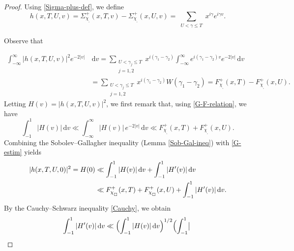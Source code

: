 \documentclass[pdflatex]{sn-jnl}%
\newcommand{\dx}{\mathrm{d}}
\theoremstyle{sltheorems}
\theoremstyle{plainrem}
\theoremstyle{definition}
\begin{document}
\begin{proof}
Using \eqref{Sigma-plus-def}, we define
%
\begin{equation}
\label{defgv}
h(x, T, U, v) = 
\Sigma^+_{\chi_{_\square}}(x,T,v) -
\Sigma^+_{\chi_{_\square}}(x,U,v) 
= \sum_{\substack{U <  \gamma \le  T
}} x^{i\gamma}e^{i\gamma v}.
\end{equation}

\noindent
Observe that

\begin{align}
\nonumber
   \int_{-\infty}^{\infty}
    \vert h(x, T, U, v) \vert ^2e^{-2 \vert v \vert }& \, \dx v 
   =
   \sum_{\substack{U <  \gamma_j \le  T\\ j = 1,2}} 
   x^{i(\gamma_1-\gamma_2)}
   \int_{-\infty}^{\infty}
   e^{i(\gamma_1-\gamma_2)v}e^{-2 \vert v \vert } \, \dx v 
  \\
   \label{G-F-relation}
   & =
    \sum_{\substack{U <  \gamma_j \le  T\\
   j = 1,2
   }} 
   x^{i(\gamma_1-\gamma_2)}
   W(\gamma_1 - \gamma_2)
   = F^+_{\chi_{_\square}}(x,T) - F^+_{\chi_{_\square}}(x,U).
\end{align}
%
Letting $H(v) =  \vert  h(x, T, U, v) \vert ^2$,
we first remark that, using \eqref{G-F-relation}, we have
%
\begin{equation}
\label{G-estim}
\int_{-1}^1 
\vert  H(v)  \vert 
\, \dx v
\ll
\int_{-\infty}^{\infty}
\vert  H(v)  \vert 
\,e^{-2 \vert v \vert }\, \dx v
\ll
F^+_{\chi_{_\square}}(x,T) + F^+_{\chi_{_\square}}(x,U).
\end{equation}
%
Combining the Sobolev--Gallagher inequality (Lemma \ref{Sob-Gal-ineq})
with
\eqref{G-estim} yields
%
\begin{align}
\notag
\vert h(x, T, U, 0) \vert ^2
= 
H(0) 
&
\ll \int_{-1}^1  \vert  H(v)  \vert  \, \dx v +  \int_{-1}^1  \vert  H^{\prime}(v)  \vert  \, \dx v  
\\
&
\label{Sob-Gall-ineq}    
\ll F^+_{\chi_{_\square}}(x,T) +  F^+_{\chi_{_\square}}(x,U) + \int_{-1}^1   \vert  H^{\prime}(v)  \vert  \, \dx v.
\end{align}
%
By the Cauchy--Schwarz inequality \eqref{Cauchy}, 
we obtain 
%
\begin{equation}
\!\!
\label{G-prime-first}
\int_{-1}^1   \vert  H^{\prime}(v)  \vert  \, \dx v  \ll  
\Bigl(\int_{-1}^1 
\vert  H(v)  \vert 
\, \dx v
\Bigr)^{1/2} 
\Bigl(\int_{-1}^1 \bigl \vert 

\end{equation}
\end{proof}
\end{document}
